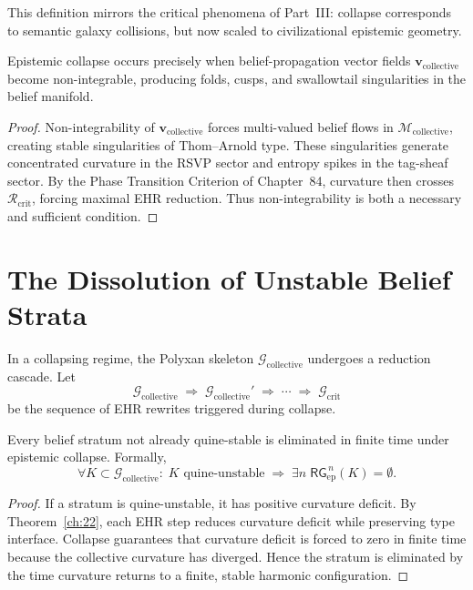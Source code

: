 This definition mirrors the critical phenomena of Part~III:
collapse corresponds to semantic galaxy collisions, but now scaled to
civilizational epistemic geometry.

\begin{proposition}
Epistemic collapse occurs precisely when belief-propagation vector fields
$\mathbf{v}_{\mathrm{collective}}$ become non-integrable, producing
folds, cusps, and swallowtail singularities in the belief manifold.
\end{proposition}

\begin{proof}
Non-integrability of $\mathbf{v}_{\mathrm{collective}}$ forces
multi-valued belief flows in $\mathcal{M}_{\mathrm{collective}}$,
creating stable singularities of Thom–Arnold type.  
These singularities generate concentrated curvature in the RSVP sector
and entropy spikes in the tag-sheaf sector.  
By the Phase Transition Criterion of Chapter~84, curvature then crosses
$\mathcal{R}_{\mathrm{crit}}$, forcing maximal EHR reduction.  
Thus non-integrability is both a necessary and sufficient condition.
\end{proof}

\section{The Dissolution of Unstable Belief Strata}

In a collapsing regime, the Polyxan skeleton
$\mathcal{G}_{\mathrm{collective}}$ undergoes a reduction cascade.
Let
\[
\mathcal{G}_{\mathrm{collective}} 
\;\Rightarrow\;
\mathcal{G}_{\mathrm{collective}}'
\;\Rightarrow\;
\cdots
\;\Rightarrow\;
\mathcal{G}_{\mathrm{crit}}
\]
be the sequence of EHR rewrites triggered during collapse.

\begin{theorem}
Every belief stratum not already quine-stable is eliminated in finite
time under epistemic collapse.  
Formally,
\[
\forall K\subset \mathcal{G}_{\mathrm{collective}}:\;
K \text{ quine-unstable}
\;\Longrightarrow\;
\exists n\; \mathsf{RG}_{\mathrm{ep}}^{\,n}(K)=\emptyset.
\]
\end{theorem}

\begin{proof}
If a stratum is quine-unstable, it has positive curvature deficit.  
By Theorem~\ref{ch:22}, each EHR step reduces curvature deficit while
preserving type interface.  
Collapse guarantees that curvature deficit is forced to zero in finite
time because the collective curvature has diverged.  
Hence the stratum is eliminated by the time curvature returns to a
finite, stable harmonic configuration.
\end{proof}

